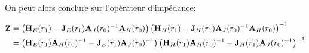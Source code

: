 
        On peut alors conclure sur l'opérateur d'impédance:

        \begin{align}
            \mathbf{Z} &= 
            \left(\mathbf{H}_{E}(r_1) - \mathbf{J}_{E}(r_1)\mathbf{A}_{J}(r_0)^{-1}\mathbf{A}_{H}(r_0)\right)
            \left(\mathbf{H}_{H}(r_1) - \mathbf{J}_{H}(r_1)\mathbf{A}_{J}(r_0)^{-1}\mathbf{A}_{H}(r_0)\right)^{-1}
            \\
            &=
            \left(\mathbf{H}_{E}(r_1)\mathbf{A}_{H}(r_0)^{-1} - \mathbf{J}_{E}(r_1)\mathbf{A}_{J}(r_0)^{-1}\right)
            \left(\mathbf{H}_{H}(r_1)\mathbf{A}_{H}(r_0)^{-1} - \mathbf{J}_{H}(r_1)\mathbf{A}_{J}(r_0)^{-1}\right)^{-1}
        \end{align}